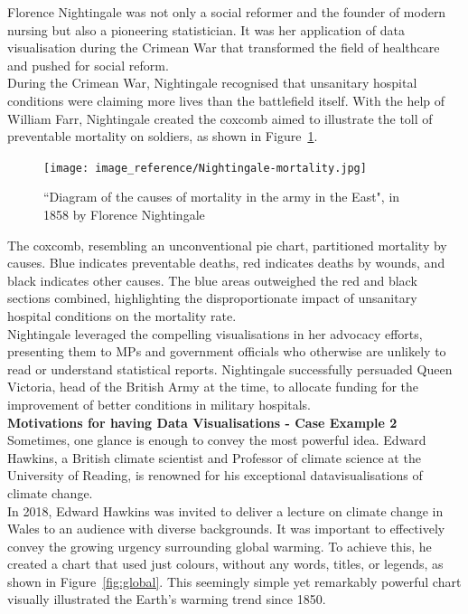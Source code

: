 \documentclass{article}\usepackage[]{graphicx}\usepackage[]{xcolor}
\begin{document}
\noindent
Florence Nightingale was not only a social reformer and the founder of modern nursing but also a pioneering statistician. It was her application of data visualisation during the Crimean War that transformed the field of healthcare and pushed for social reform.\\  

\noindent
During the Crimean War, Nightingale recognised that unsanitary hospital conditions were claiming more lives than the battlefield itself. With the help of William Farr, Nightingale created the coxcomb aimed to illustrate the toll of preventable mortality on soldiers, as shown in Figure~\ref{fig:coxcomb}.

\begin{figure}[H]
    \centering
    \texttt{[image: image\_reference/Nightingale-mortality.jpg]}
    \caption{``Diagram of the causes of mortality in the army in the East", in 1858 by Florence Nightingale\cite{wikiFN}}
    \label{fig:coxcomb}
\end{figure}

\noindent 
The coxcomb, resembling an unconventional pie chart, partitioned mortality by causes. Blue indicates preventable deaths, red indicates deaths by wounds, and black indicates other causes. The blue areas outweighed the red and black sections combined, highlighting the disproportionate impact of unsanitary hospital conditions on the mortality rate.\\

\noindent
Nightingale leveraged the compelling visualisations in her advocacy efforts, presenting them to MPs and government officials who otherwise are unlikely to read or understand statistical reports. Nightingale successfully persuaded Queen Victoria, head of the British Army at the time, to allocate funding for the improvement of better conditions in military hospitals.\\

\noindent
\textbf{Motivations for having Data Visualisations - Case Example 2}\\

\noindent
Sometimes, one glance is enough to convey the most powerful idea. Edward Hawkins, a British climate scientist and Professor of climate science at the University of Reading, is renowned for his exceptional datavisualisations of climate change.\\

\noindent
In 2018, Edward Hawkins was invited to deliver a lecture on climate change in Wales to an audience with diverse backgrounds. It was important to effectively convey the growing urgency surrounding global warming. To achieve this, he created a chart that used just colours, without any words, titles, or legends, as shown in Figure~\ref{fig:global}. This seemingly simple yet remarkably powerful chart visually illustrated the Earth's warming trend since 1850.
\end{document}
